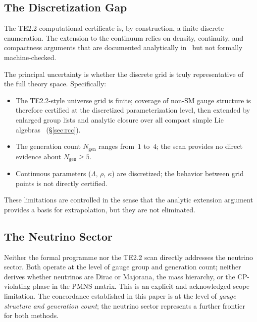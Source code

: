 \documentclass[11pt,twocolumn]{article}
\theoremstyle{remark}
\begin{document}
\subsection{The Discretization Gap}
\label{sec:disc-gap}

The TE2.2 computational certificate is, by construction, a finite
discrete enumeration.
The extension to the continuum relies on density, continuity, and
compactness arguments that are documented analytically
in~\cite{SpivackPSCConcordance} but not formally machine-checked.

The principal uncertainty is whether the discrete grid is truly
representative of the full theory space.
Specifically:
\begin{itemize}
  \item The TE2.2-style universe grid is finite; coverage of non-SM gauge
        structure is therefore certified at the discretized parameterization
        level, then extended by enlarged group lists and analytic closure over
        all compact simple Lie algebras~\cite{ugp-lean} (\S\ref{sec:rcc}).
  \item The generation count $N_{\mathrm{gen}}$ ranges from~$1$
        to~$4$; the scan provides no direct evidence about
        $N_{\mathrm{gen}}\geq 5$.
  \item Continuous parameters ($\Lambda$, $\rho$, $\kappa$) are
        discretized; the behavior between grid points is not directly
        certified.
\end{itemize}
These limitations are controlled in the sense that the analytic
extension argument provides a basis for extrapolation, but they are
not eliminated.

\subsection{The Neutrino Sector}
\label{sec:neutrino}

Neither the formal programme nor the TE2.2 scan directly addresses
the neutrino sector.
Both operate at the level of gauge group and generation count; neither
derives whether neutrinos are Dirac or Majorana, the mass hierarchy,
or the CP-violating phase in the PMNS matrix.
This is an explicit and acknowledged scope limitation.
The concordance established in this paper is at the level of
\emph{gauge structure and generation count}; the neutrino sector
represents a further frontier for both methods.
\end{document}
